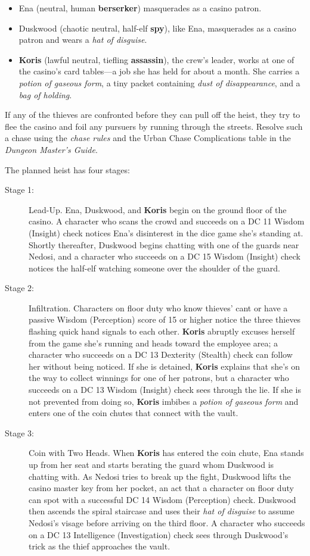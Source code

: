 \documentclass[10pt,a4paper,twoside,bg=print,twocolumn,openany,nodeprecatedcode]{dndbook}
\begin{document}
\begin{itemize}
\item Ena (neutral, human \textbf{berserker}) masquerades as a casino patron.
\item Duskwood (chaotic neutral, half-elf \textbf{spy}), like Ena, masquerades as a casino patron and wears a \textit{hat of disguise}.
\item \textbf{Koris} (lawful neutral, tiefling \textbf{assassin}), the crew's leader, works at one of the casino's card tables—a job she has held for about a month. She carries a \textit{potion of gaseous form}, a tiny packet containing \textit{dust of disappearance}, and a \textit{bag of holding}.
\end{itemize}

If any of the thieves are confronted before they can pull off the heist, they try to flee the casino and foil any pursuers by running through the streets. Resolve such a chase using the \textit{chase rules} and the Urban Chase Complications table in the \textit{Dungeon Master's Guide}.

The planned heist has four stages:


\begin{description}
\item[Stage 1:]
Lead-Up. Ena, Duskwood, and \textbf{Koris} begin on the ground floor of the casino. A character who scans the crowd and succeeds on a DC 11 Wisdom (Insight) check notices Ena's disinterest in the dice game she's standing at. Shortly thereafter, Duskwood begins chatting with one of the guards near Nedosi, and a character who succeeds on a DC 15 Wisdom (Insight) check notices the half-elf watching someone over the shoulder of the guard.
\item[Stage 2:]
Infiltration. Characters on floor duty who know thieves' cant or have a passive Wisdom (Perception) score of 15 or higher notice the three thieves flashing quick hand signals to each other. \textbf{Koris} abruptly excuses herself from the game she's running and heads toward the employee area; a character who succeeds on a DC 13 Dexterity (Stealth) check can follow her without being noticed. If she is detained, \textbf{Koris} explains that she's on the way to collect winnings for one of her patrons, but a character who succeeds on a DC 13 Wisdom (Insight) check sees through the lie. If she is not prevented from doing so, \textbf{Koris} imbibes a \textit{potion of gaseous form} and enters one of the coin chutes that connect with the vault.
\item[Stage 3:]
Coin with Two Heads. When \textbf{Koris} has entered the coin chute, Ena stands up from her seat and starts berating the guard whom Duskwood is chatting with. As Nedosi tries to break up the fight, Duskwood lifts the casino master key from her pocket, an act that a character on floor duty can spot with a successful DC 14 Wisdom (Perception) check. Duskwood then ascends the spiral staircase and uses their \textit{hat of disguise} to assume Nedosi's visage before arriving on the third floor. A character who succeeds on a DC 13 Intelligence (Investigation) check sees through Duskwood's trick as the thief approaches the vault.
\end{description}
\end{document}
